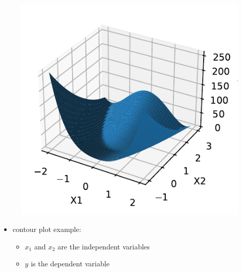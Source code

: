 \documentclass[
  letterpaper,
  DIV=11,
  numbers=noendperiod]{scrreprt}
\providecommand{\tightlist}{%
  \setlength{\itemsep}{0pt}\setlength{\parskip}{0pt}}\usepackage{longtable,booktabs,array}
\begin{document}
\begin{figure}[H]

{\centering \includegraphics{005_num_rsm_files/figure-pdf/cell-2-output-1.pdf}

}

\end{figure}

\begin{itemize}
\tightlist
\item
  contour plot example:

  \begin{itemize}
  \tightlist
  \item
    \(x_1\) and \(x_2\) are the independent variables
  \item
    \(y\) is the dependent variable
  \end{itemize}
\end{itemize}
\end{document}
